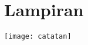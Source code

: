 \documentclass[./../SKRIPSI_ALDZIKRI_DWIJAYANTO_PRATHAMA.tex]{subfiles}
\begin{document}
\chapter*{Lampiran}
\texttt{[image: catatan]}
\end{document}
